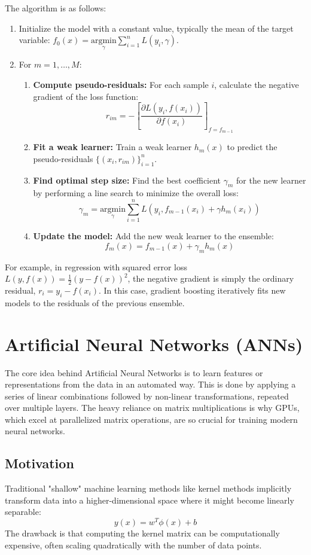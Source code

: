\documentclass{article}
\begin{document}
\begin{multicols}{2}
	The algorithm is as follows:
	\begin{enumerate}
		\item Initialize the model with a constant value, typically the mean of the target variable: $f_0(x) = \underset{\gamma}{\text{argmin}} \sum_{i=1}^n L(y_i, \gamma)$.
		\item For $m = 1, \dots, M$:
		      \begin{enumerate}
			      \item \textbf{Compute pseudo-residuals:} For each sample $i$, calculate the negative gradient of the loss function:
			            $$ r_{im} = -\left[\frac{\partial L(y_i, f(x_i))}{\partial f(x_i)}\right]_{f=f_{m-1}} $$
			      \item \textbf{Fit a weak learner:} Train a weak learner $h_m(x)$ to predict the pseudo-residuals $\{ (x_i, r_{im}) \}_{i=1}^n$.
			      \item \textbf{Find optimal step size:} Find the best coefficient $\gamma_m$ for the new learner by performing a line search to minimize the overall loss:
			            $$ \gamma_m = \underset{\gamma}{\text{argmin}} \sum_{i=1}^{n} L(y_i, f_{m-1}(x_i) + \gamma h_m(x_i)) $$
			      \item \textbf{Update the model:} Add the new weak learner to the ensemble:
			            $$ f_m(x) = f_{m-1}(x) + \gamma_m h_m(x) $$
		      \end{enumerate}
	\end{enumerate}
	For example, in regression with squared error loss $L(y, f(x)) = \frac{1}{2}(y-f(x))^2$, the negative gradient is simply the ordinary residual, $r_i = y_i - f(x_i)$. In this case, gradient boosting iteratively fits new models to the residuals of the previous ensemble.

	\section{Artificial Neural Networks (ANNs)}
	The core idea behind Artificial Neural Networks is to learn features or representations from the data in an automated way. This is done by applying a series of linear combinations followed by non-linear transformations, repeated over multiple layers. The heavy reliance on matrix multiplications is why GPUs, which excel at parallelized matrix operations, are so crucial for training modern neural networks.

	\subsection{Motivation}
	Traditional "shallow" machine learning methods like kernel methods implicitly transform data into a higher-dimensional space where it might become linearly separable:
	$$ y(x) = w^T \phi(x) + b $$
	The drawback is that computing the kernel matrix can be computationally expensive, often scaling quadratically with the number of data points.


\end{multicols}
\end{document}
